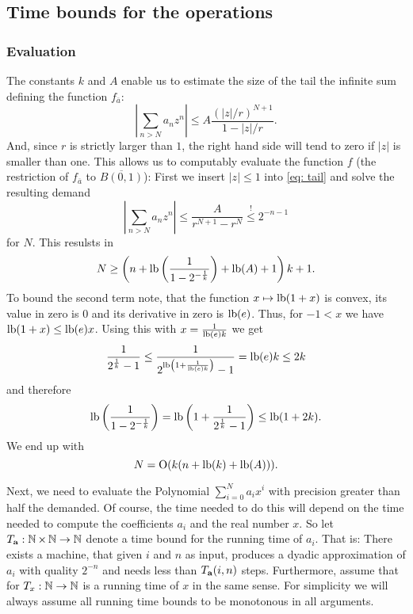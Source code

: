 \newpage

	\subsection{Time bounds for the operations}

		\subsubsection{Evaluation}

			The constants $k$ and $A$ enable us to estimate the size of the tail the infinite sum defining the function $f_{\overline a}$:
			\begin{equation}\label{eq: tail}
				\left|\sum_{n > N} a_n z^n\right| \leq A \frac{(|z|/r)^{N+1}}{1- |z|/r}.
			\end{equation}
			And, since $r$ is strictly larger than $1$, the right hand side will tend to zero if $|z|$ is smaller than one.
			This allows us to computably evaluate the function $f$ (the restriction of $f_{\overline a}$ to $\overline{B(0,1)}$):
			First we insert $|z|\leq 1$ into \cref{eq: tail} and solve the resulting demand
			\begin{equation*}
				\left|\sum_{n > N} a_n z^n\right| \leq \frac A {r^{N+1}-r^N} \stackrel!\leq  2^{-n-1}
			\end{equation*}
			for $N$.
			This resulsts in
			\[ N \geq \left(n+\mathrm{lb}\left(\frac1{1-2^{-\frac1k}}\right) + \mathrm{lb}(A) + 1\right)k +1. \]
			To bound the second term note, that the function $x\mapsto \mathrm{lb}(1+x)$ is convex, its value in zero is $0$ and its derivative in zero is $\mathrm{lb}(e)$.
			Thus, for $-1<x$ we have $\mathrm{lb}(1+x)\leq \mathrm{lb}(e)x$.
			Using this with $x=\frac1{\mathrm{lb}(e)k}$ we get
			\[ \frac 1{2^{\frac 1k}-1} \leq \frac 1{2^{\mathrm{lb}\left(1+\frac1{\mathrm{lb}(e)k}\right)} - 1} = \mathrm{lb}(e) k \leq 2k \]
			and therefore
			\[ \mathrm{lb}\left(\frac1{1-2^{-\frac1k}}\right) = \mathrm{lb}\left(1+\frac1{2^{\frac1k}-1}\right)\leq \mathrm{lb}(1+2k). \]
			We end up with
			\[ N = \mathrm O(k(n+\mathrm{lb}(k)+\mathrm{lb}(A))). \]
			
			Next, we need to evaluate the Polynomial $\sum_{i = 0}^N a_i x^i$ with precision greater than half the demanded.
			Of course, the time needed to do this will depend on the time needed to compute the coefficients $a_i$ and the real number $x$.
			So let $T_{\mathbf{a}}:\operatorname{\mathbb{N}}\times\operatorname{\mathbb{N}} \to \operatorname{\mathbb{N}}$ denote a time bound for the running time of $a_i$.
			That is: There exists a machine, that given $i$ and $n$ as input, produces a dyadic approximation of $a_i$ with quality $2^{-n}$ and needs less than $T_{\mathbf{a}}(i,n)$ steps.
			Furthermore, assume that for  $T_x:\operatorname{\mathbb{N}}\to\operatorname{\mathbb{N}}$ is a running time of $x$ in the same sense.
			For simplicity we will always assume all running time bounds to be monotonous in all arguments.

